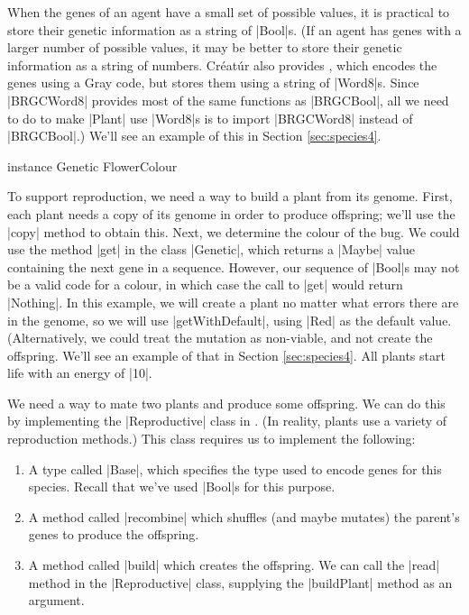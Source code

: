 When the genes of an agent have a small set of possible values,
it is practical to store their genetic information as a string of |Bool|s.
(If an agent has genes with a larger number of possible values,
it may be better to store their genetic information as a string of numbers.
Créatúr also provides ,
which encodes the genes using a Gray code, but stores them using a string of |Word8|s.
Since |BRGCWord8| provides most of the same functions as |BRGCBool|,
all we need to do to make |Plant| use |Word8|s is to import |BRGCWord8|
instead of |BRGCBool|.)
We'll see an example of this in Section \ref{sec:species4}.

\begin{code}
instance Genetic FlowerColour
\end{code} 

To support reproduction, we need a way to build a plant from its genome.
First, each plant needs a copy of its genome in order to produce offspring;
we'll use the |copy| method to obtain this.
Next, we determine the colour of the bug.
We could use the method |get| in the class |Genetic|, 
which returns a |Maybe| value containing the next gene in a sequence.
However, our sequence of |Bool|s may not
be a valid code for a colour, in which case the call to |get|
would return |Nothing|.
In this example, we will create a plant no matter what errors there are in 
the genome, so we will use |getWithDefault|, using |Red| as the default value.
(Alternatively, we could treat the mutation as non-viable,
and not create the offspring.
We'll see an example of that in Section \ref{sec:species4}.
All plants start life with an energy of |10|.
        

We need a way to mate two plants and produce some offspring.
We can do this by implementing the |Reproductive| class in 
.
(In reality, plants use a variety of reproduction methods.)
This class requires us to implement the following:
\begin{enumerate}
\item A type called |Base|, which specifies the type used to encode
genes for this species. Recall that we've used |Bool|s for this purpose.
\item A method called |recombine| which shuffles (and maybe mutates) the
 parent's genes to produce the offspring.
\item A method called |build| which creates the offspring.
We can call the |read| method in the |Reproductive| class,
supplying the |buildPlant| method as an argument.
\end {enumerate}

